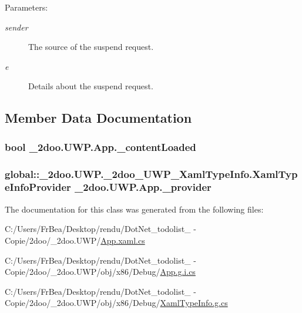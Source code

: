 \begin{Desc}
\item[Parameters:]
\begin{description}
\item[{\em sender}]The source of the suspend request.\item[{\em e}]Details about the suspend request.\end{description}
\end{Desc}


\subsection{Member Data Documentation}
\hypertarget{class__2doo_1_1_u_w_p_1_1_app_3105674852bc85e875b4dd01465cd8ce}{
\subsubsection[{\_\-contentLoaded}]{\setlength{\rightskip}{0pt plus 5cm}bool {\bf \_\-2doo.UWP.App.\_\-contentLoaded}}}
\label{class__2doo_1_1_u_w_p_1_1_app_3105674852bc85e875b4dd01465cd8ce}


\hypertarget{class__2doo_1_1_u_w_p_1_1_app_23b305ac503ed70611fb8e448ab6f831}{
\subsubsection[{\_\-provider}]{\setlength{\rightskip}{0pt plus 5cm}global::\_\-2doo.UWP.\_\-2doo\_\-UWP\_\-XamlTypeInfo.XamlTypeInfoProvider {\bf \_\-2doo.UWP.App.\_\-provider}}}
\label{class__2doo_1_1_u_w_p_1_1_app_23b305ac503ed70611fb8e448ab6f831}




The documentation for this class was generated from the following files:\begin{CompactItemize}
\item 
C:/Users/FrBea/Desktop/rendu/DotNet\_\-todolist\_ - Copie/2doo/\_\-2doo.UWP/\hyperlink{_u_w_p_2_app_8xaml_8cs}{App.xaml.cs}\item 
C:/Users/FrBea/Desktop/rendu/DotNet\_\-todolist\_ - Copie/2doo/\_\-2doo.UWP/obj/x86/Debug/\hyperlink{_app_8g_8i_8cs}{App.g.i.cs}\item 
C:/Users/FrBea/Desktop/rendu/DotNet\_\-todolist\_ - Copie/2doo/\_\-2doo.UWP/obj/x86/Debug/\hyperlink{_xaml_type_info_8g_8cs}{XamlTypeInfo.g.cs}\end{CompactItemize}
